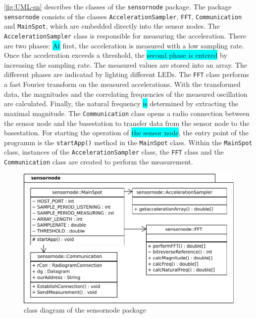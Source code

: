 \documentclass[12pt,a4paper]{scrartcl}
\begin{document}
\autoref{fig:UML-sn} describes the classes of the \texttt{sensor\-node} package.
The package \texttt{sensor\-node} consists of the classes \texttt{Acceleration\-Sampler}, \texttt{FFT}, \texttt{Communi\-cation} and \texttt{Main\-Spot}, which are embedded directly into the sensor nodes.
The \texttt{Acceleration\-Sampler} class is responsible for measuring the acceleration.
There are two phases: \colorbox{cyan}{At} first, the acceleration is measured with a low sampling rate.
Once the acceleration exceeds a threshold, the \colorbox{cyan}{second phase is entered} by increasing the sampling rate. 
The measured values are stored into an array.
The different phases are indicatad by lighting different LEDs.
The \texttt{FFT} class performs a fast Fourier transform on the measured accelerations. 
With the transformed data, the magnitudes and the correlating frequencies of the measured oscillation are calculated.
Finally, the natural frequency \colorbox{cyan}{is} determined by extracting the maximal magnitude.
The \texttt{Communi\-cation} class opens a radio connection between the sensor node and the basestation to transfer data from the sensor node to the basestation.
For starting the operation of \colorbox{cyan}{the sensor node}, the entry point of the programm is the \texttt{start\-App()} method in the \texttt{Main\-Spot} class. 
Within the \texttt{Main\-Spot} class, instances of the \texttt{Acceleration\-Sampler} class, the \texttt{FFT} class and the \texttt{Communication} class are created to perform the measurement.

\begin{figure}[ht]
    \centering
    \includegraphics[width = \textwidth]{figures/uml-sensornode.pdf}
    \caption{class diagram of the sensornode package}
    \label{fig:UML-sn}
\end{figure}
\end{document}
